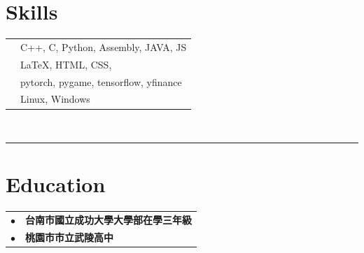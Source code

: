 \documentclass[oneside]{article}
\begin{document}
{\begin{minipage}[t][\textheight-2\fboxsep-2\fboxrule][t]{\dimexpr0.40\textwidth-2\fboxrule-2\fboxsep\relax}
        \section*{\large Skills}
        \begin{tabularx}{\textwidth}{cY}
            \faCode{}        & C++, C, Python, Assembly, JAVA, JS\\[.5ex]
            \faPen*{}        & LaTeX, HTML, CSS,  \\[.5ex]
            \faToolbox{}     & pytorch, pygame, tensorflow, yfinance\\[.5ex]
            \faCogs{}        & Linux, Windows \\[.5ex]
        \end{tabularx}
        \vspace{1pt} \\
        \rule{\linewidth}{0.4pt}
        \section*{\large Education}
        \begin{tabularx}{\textwidth}{cY}
        $\bullet$    & \textbf{台南市國立成功大學大學部在學三年級} \\[.5ex]
        $\bullet$    & \textbf{桃園市市立武陵高中} \\[.5ex]
        \end{tabularx}
        \vspace{.3cm} \\
        
    \end{minipage} 
}
\hfill
\end{document}
